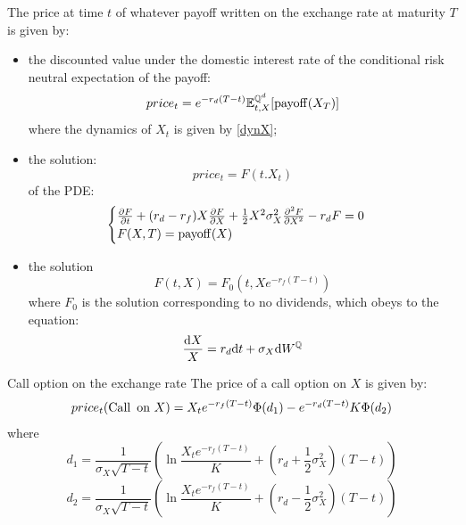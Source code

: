 \begin{proposition}
    The price at time $t$ of whatever payoff written on the exchange rate at maturity $T$ is given by:
    \begin{itemize}
    \item the discounted value under the domestic interest rate of the conditional risk neutral expectation of the payoff:
    \begin{equation}
    price_t = e^{-r_d(T-t)}\mathbb{E}^{\mathbb{Q}^d}_{t,X}[\operatorname{payoff}(X_T)]
    \end{equation}
    where the dynamics of $X_t$ is given by \eqref{dynX};
    \item the solution:
    \begin{equation}
        price_t = F(t.X_t)
    \end{equation}
    of the PDE:
    \begin{equation}
        \begin{cases}
        \pdv{F}{t} + (r_d-r_f)X\pdv{F}{X} + \frac{1}{2}X^2\sigma_X^2\pdv[2]{F}{X} - r_dF = 0\\
        F(X,T) = \operatorname{payoff}(X)
        \end{cases}
    \end{equation}
    \item the solution \begin{equation}
        F(t,X) = F_0(t,Xe^{-r_f(T-t)})
    \end{equation}
    where $F_0$ is the solution corresponding to no dividends, which obeys to the equation:
    \begin{equation}
        \frac{\dd X}{X} = r_d\dd t + \sigma_X\dd W^{\mathbb{Q}}
    \end{equation}
    \end{itemize}
\end{proposition}
\begin{example}{Call option on the exchange rate}{}{}
    The price of a call option on $X$ is given by:
   \begin{align}
       price_t(\operatorname{Call}\text{ on } X) = X_t e^{-r_f(T-t)}\Phi(d_1) - e^{-r_d(T-t)}K\Phi(d_2)
   \end{align}
   where
   \begin{equation}
       d_1 = \frac{1}{\sigma_X\sqrt{T-t}}\left(\ln\frac{X_te^{-r_f(T-t)}}{K}+\left(r_d+\frac{1}{2}\sigma_X^2\right)(T-t)\right)
   \end{equation}
   \begin{equation}
       d_2 = \frac{1}{\sigma_X\sqrt{T-t}}\left(\ln\frac{X_te^{-r_f(T-t)}}{K}+\left(r_d-\frac{1}{2}\sigma_X^2\right)(T-t)\right)
   \end{equation}
\end{example}
